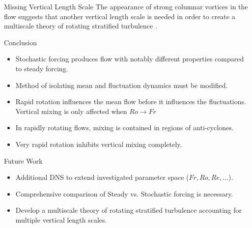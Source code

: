 \documentclass{beamer}
\begin{document}
\begin{frame}{Missing Vertical Length Scale}
    The appearance of strong columnar vortices in the flow suggests that another vertical length scale is needed in order to create a multiscale theory of rotating stratified turbulence \citep[cf.][]{SpragueJulienKnoblochWerne2006, JulienKnobloch2007}.
    
\end{frame}

\begin{frame}{Conclusion}

    \begin{itemize}
        \item Stochastic forcing produces flow with notably different properties compared to steady forcing.
        \item Method of isolating mean and fluctuation dynamics must be modified.
        \item Rapid rotation influences the mean flow before it influences the fluctuations. Vertical mixing is only affected when $Ro \to Fr$
        \item In rapidly rotating flows, mixing is contained in regions of anti-cyclones.
        \item Very rapid rotation inhibits vertical mixing completely.
    \end{itemize}

\end{frame}

\begin{frame}{Future Work}
    \begin{itemize}
        \item Additional DNS to extend investigated parameter space ($Fr, Ro, Re, \ldots$).
        \item Comprehensive comparison of Steady vs. Stochastic forcing is necessary.
        \item Develop a multiscale theory of rotating stratified turbulence accounting for multiple vertical length scales.
    \end{itemize}
\end{frame}

{\scriptsize


}
\end{document}
